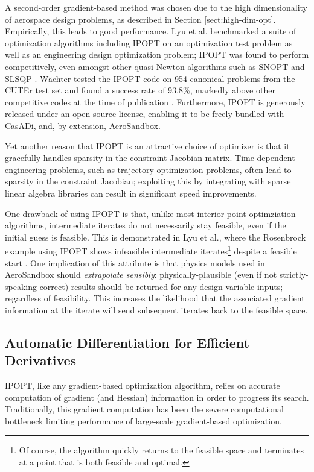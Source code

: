 A second-order gradient-based method was chosen due to the high dimensionality of aerospace design problems, as described in Section \ref{sect:high-dim-opt}. Empirically, this leads to good performance. Lyu et al. benchmarked a suite of optimization algorithms including IPOPT on an optimization test problem as well as an engineering design optimization problem; IPOPT was found to perform competitively, even amongst other quasi-Newton algorithms such as SNOPT and SLSQP \cite{lyu2014}. Wächter tested the IPOPT code on 954 canonical problems from the CUTEr test set and found a success rate of 93.8\%, markedly above other competitive codes at the time of publication \cite{ipopt}. Furthermore, IPOPT is generously released under an open-source license, enabling it to be freely bundled with CasADi, and, by extension, AeroSandbox.

Yet another reason that IPOPT is an attractive choice of optimizer is that it gracefully handles sparsity in the constraint Jacobian matrix. Time-dependent engineering problems, such as trajectory optimization problems, often lead to sparsity in the constraint Jacobian; exploiting this by integrating with sparse linear algebra libraries can result in significant speed improvements.


One drawback of using IPOPT is that, unlike most interior-point optimziation algorithms, intermediate iterates do not necessarily stay feasible, even if the initial guess is feasible. This is demonstrated in Lyu et al., where the Rosenbrock example using IPOPT shows infeasible intermediate iterates\footnote{Of course, the algorithm quickly returns to the feasible space and terminates at a point that is both feasible and optimal.} despite a feasible start \cite{lyu2014}. One implication of this attribute is that physics models used in AeroSandbox should \textit{extrapolate sensibly}: physically-plausible (even if not strictly-speaking correct) results should be returned for any design variable inputs; regardless of feasibility. This increases the likelihood that the associated gradient information at the iterate will send subsequent iterates back to the feasible space.

\subsection{Automatic Differentiation for Efficient Derivatives}
\label{sect:ad}

IPOPT, like any gradient-based optimization algorithm, relies on accurate computation of gradient (and Hessian) information in order to progress its search. Traditionally, this gradient computation has been the severe computational bottleneck limiting performance of large-scale gradient-based optimization.

